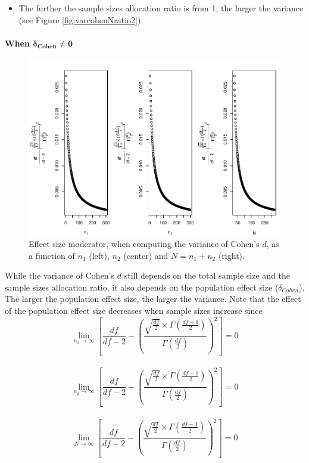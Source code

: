 \documentclass[
  english,
  man,mask]{apa6}
\providecommand{\tightlist}{%
  \setlength{\itemsep}{0pt}\setlength{\parskip}{0pt}}
\let\oldparagraph\paragraph
\renewcommand{\paragraph}[1]{\oldparagraph{#1}\mbox{}}
\begin{document}
\begin{itemize}
\tightlist
\item
  The further the sample sizes allocation ratio is from 1, the larger the variance (see Figure \ref{fig:varcohenNratio2}).
\end{itemize}

\hypertarget{when-bmdelta_cohenneq-0}{%
\paragraph{\texorpdfstring{When \(\bm{\delta_{Cohen}\neq 0}\)}{When \textbackslash bm\{\textbackslash delta\_\{Cohen\}\textbackslash neq 0\}}}\label{when-bmdelta_cohenneq-0}}

\begin{figure}
\centering
\includegraphics{Theoretical-Variance-of-all-estimators-as-a-function-of-population-parameters_files/figure-latex/ESmoderatorcohenNsize2-1.pdf}
\caption{\label{fig:ESmoderatorcohenNsize2}Effect size moderator, when computing the variance of Cohen's \(d\), as a function of \(n_1\) (left), \(n_2\) (center) and \(N=n_1+n_2\) (right).}
\end{figure}

While the variance of Cohen's \(d\) still depends on the total sample size and the sample sizes allocation ratio, it also depends on the population effect size (\(\delta_{Cohen}\)). The larger the population effect size, the larger the variance. Note that the effect of the population effect size decreases when sample sizes increase since
\[\lim_{n_1\rightarrow \infty}\left[\frac{df}{df-2} - \left( \frac{\sqrt{\frac{df}{2}} \times \Gamma \left(\frac{df-1}{2} \right)}{\Gamma \left( \frac{df}{2}\right)}\right)^2 \right]=0\]\\
\[\lim_{n_2\rightarrow \infty}\left[\frac{df}{df-2} - \left( \frac{\sqrt{\frac{df}{2}} \times \Gamma \left(\frac{df-1}{2} \right)}{\Gamma \left( \frac{df}{2}\right)}\right)^2 \right]=0\]\\
\[\lim_{N\rightarrow \infty}\left[\frac{df}{df-2} - \left( \frac{\sqrt{\frac{df}{2}} \times \Gamma \left(\frac{df-1}{2} \right)}{\Gamma \left( \frac{df}{2}\right)}\right)^2 \right]=0\]
\end{document}
